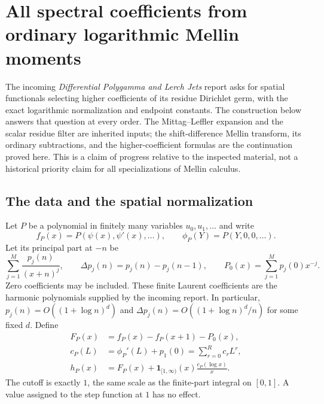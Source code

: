 \documentclass[11pt,letterpaper]{article}
\theoremstyle{definition}
\theoremstyle{remark}
\numberwithin{equation}{section}
\begin{document}


\section{All spectral coefficients from ordinary logarithmic Mellin moments}
\label{mellin:section}

The incoming \emph{Differential Polygamma and Lerch Jets} report
\cite[Section~9]{incoming-differential} asks for
spatial functionals selecting higher coefficients of its residue Dirichlet
germ, with the exact logarithmic normalization and endpoint constants.
The construction below answers that question at every order.  The
Mittag--Leffler expansion and the scalar residue filter are inherited
inputs; the shift-difference Mellin transform, its ordinary subtractions,
and the higher-coefficient formulas are the continuation proved here.
This is a claim of progress relative to the inspected material, not a
historical priority claim for all specializations of Mellin calculus.

\subsection{The data and the spatial normalization}

Let $P$ be a polynomial in finitely many variables $u_0,u_1,\ldots$ and
write
\[
 f_P(x)=P(\psi(x),\psi'(x),\ldots),\qquad
 \phi_P(Y)=P(Y,0,0,\ldots).
\]
Let its principal part at $-n$ be
\[
 \sum_{j=1}^{M}\frac{p_j(n)}{(x+n)^j},\qquad
 \Delta p_j(n)=p_j(n)-p_j(n-1),\qquad
 P_0(x)=\sum_{j=1}^{M}p_j(0)x^{-j}.
\]
Zero coefficients may be included.  These finite Laurent coefficients
are the harmonic polynomials supplied by the incoming report.  In
particular, $p_j(n)=O((1+\log n)^d)$ and
$\Delta p_j(n)=O((1+\log n)^d/n)$ for some fixed $d$.
Define
\begin{align}
 F_P(x)&=f_P(x)-f_P(x+1)-P_0(x),\label{mellin:F}\\
 c_P(L)&=\phi_P'(L)+p_1(0)=\sum_{r=0}^{R}c_rL^r,\label{mellin:c}\\
 h_P(x)&=F_P(x)+\mathbf 1_{[1,\infty)}(x)\frac{c_P(\log x)}x.
 \label{mellin:h}
\end{align}
The cutoff is exactly $1$, the same scale as the finite-part integral
on $[0,1]$.  A value assigned to the step function at $1$ has no effect.
\end{document}

